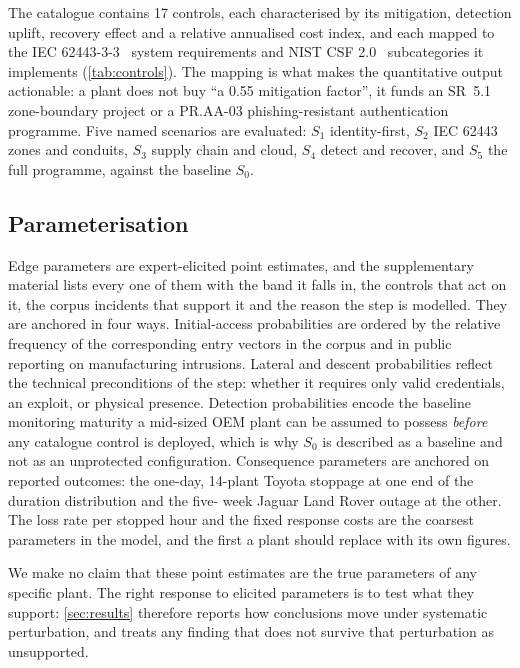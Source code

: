 The catalogue contains 17 controls, each characterised by its mitigation,
detection uplift, recovery effect and a relative annualised cost index, and
each mapped to the IEC 62443-3-3~\cite{iec624433303} system requirements and
NIST CSF 2.0~\cite{nistcsf2} subcategories it implements (\cref{tab:controls}). The mapping is what makes
the quantitative output actionable: a plant does not buy ``a 0.55 mitigation
factor'', it funds an SR~5.1 zone-boundary project or a PR.AA-03
phishing-resistant authentication programme. Five named scenarios are
evaluated: $S_1$ identity-first, $S_2$ IEC 62443 zones and conduits, $S_3$
supply chain and cloud, $S_4$ detect and recover, and $S_5$ the full
programme, against the baseline $S_0$.



\subsection{Parameterisation}

Edge parameters are expert-elicited point estimates, and the supplementary
material lists every one of them with the band it falls in, the controls that
act on it, the corpus incidents that support it and the reason the step is
modelled. They are anchored in four ways.
Initial-access probabilities are ordered by the relative frequency of the
corresponding entry vectors in the corpus and in public reporting on
manufacturing intrusions. Lateral and descent probabilities reflect the
technical preconditions of the step: whether it requires only valid credentials,
an exploit, or physical presence. Detection probabilities encode
the baseline monitoring maturity a mid-sized OEM plant can be assumed to
possess \emph{before} any catalogue control is deployed, which is why $S_0$ is described as a baseline and not as an unprotected
configuration. Consequence parameters are anchored on reported outcomes: the one-day,
14-plant Toyota stoppage at one end of the duration distribution and the five-
week Jaguar Land Rover outage at the other. The loss rate per stopped hour and
the fixed response costs are the coarsest parameters in the model, and the
first a plant should replace with its own figures.

We make no claim that these point estimates are the true parameters of any
specific plant. The right response to elicited parameters is to test what they support: \cref{sec:results} therefore
reports how conclusions move under systematic perturbation, and treats any
finding that does not survive that perturbation as unsupported.

